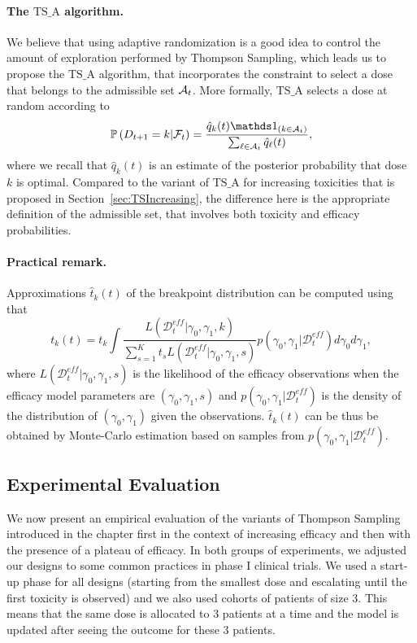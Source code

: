 \paragraph{The $\bm{\mathrm{TS}\_\mathrm{A}}$ algorithm.} We believe that using adaptive randomization is a good idea to control the amount of exploration performed by Thompson Sampling, which leads us to propose the $\mathrm{TS}\_\mathrm{A}$ algorithm, that incorporates the constraint to select a dose that belongs to the admissible set $\mathcal{A}_t$. More formally, $\mathrm{TS}\_\mathrm{A}$ selects a dose at random according to   
\[\bP\left(D_{t+1} = k | \cF_{t}\right) = \frac{\hat{q}_k(t) \ind_{\left(k \in \cA_t\right)}}{\sum_{\ell \in \cA_t} \hat{q}_{\ell}(t)},\]
where we recall that $\hat{q}_k(t)$ is an estimate of the posterior probability that dose $k$ is optimal. Compared to the variant of $\mathrm{TS}\_\mathrm{A}$  for increasing toxicities that is proposed in Section~\ref{sec:TSIncreasing}, the difference here is the appropriate definition of the admissible set, that involves both toxicity and efficacy probabilities.


\paragraph{Practical remark.} Approximations $\hat{t}_k(t)$ of the breakpoint distribution can be computed using that
\[
t_k(t) = {t_k \int \frac{L(\mathcal{D}^{eff}_t | \gamma_0,\gamma_1,k)}{\sum_{s=1}^K t_s L(\mathcal{D}^{eff}_t | \gamma_0,\gamma_1,s)} p(\gamma_0,\gamma_1 | \mathcal{D}^{eff}_t) d\gamma_0 d\gamma_1},
\]
where $L(\mathcal{D}^{eff}_t | \gamma_0,\gamma_1,s)$ is the likelihood of the efficacy observations when the efficacy model parameters are $(\gamma_0,\gamma_1,s)$ and $p(\gamma_0,\gamma_1 | \mathcal{D}^{eff}_t)$ is the density of the distribution of $(\gamma_0,\gamma_1)$ given the observations. $\hat{t}_k(t)$ can be thus be obtained by Monte-Carlo estimation based on samples from $p(\gamma_0,\gamma_1 | \mathcal{D}^{eff}_t)$. 



\subsection{Experimental Evaluation}\label{sec:Experiments}

We now present an empirical evaluation of the variants of Thompson Sampling introduced in the chapter first in the context of increasing efficacy and then with the presence of a plateau of efficacy. In both groups of experiments, we adjusted our designs to some common practices in phase I clinical trials. We used a start-up phase for all designs (starting from the smallest dose and escalating until the first toxicity is observed) and we also used cohorts of patients of size 3. This means that the same dose is allocated to 3 patients at a time and the model is updated after seeing the outcome for these 3 patients. 

